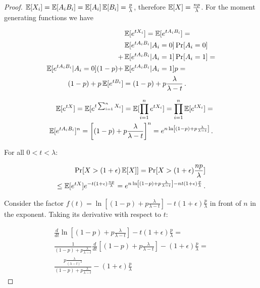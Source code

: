 \begin{proof}
  $\mathop{{}\mathbb{E}}[X_i] = \mathop{{}\mathbb{E}}[A_i B_i] = \mathop{{}\mathbb{E}}[A_i] \mathop{{}\mathbb{E}}[B_i] = \frac{p}{\lambda}$, therefore
  $\mathop{{}\mathbb{E}}[X] = \frac{np}{\lambda}$. For the moment generating functions we have

  \begin{align*}
    &\mathop{{}\mathbb{E}}[e^{t X_i}] = \mathop{{}\mathbb{E}}[e^{t A_i B_i}] =\\
      &\mathop{{}\mathbb{E}}[e^{t A_i B_i}|A_i = 0] \Pr[A_i = 0]\\
    + &\mathop{{}\mathbb{E}}[e^{t A_i B_i}|A_i = 1] \Pr[A_i = 1] = \\
    \mathop{{}\mathbb{E}}[e^{t A_i B_i}|A_i = 0] (1 - p) + &\mathop{{}\mathbb{E}}[e^{t A_i B_i}|A_i = 1] p = \\
    (1 - p) + p \mathop{{}\mathbb{E}}[e^{t B_i}] &= (1 - p) + p \frac{\lambda}{\lambda - t}\,.
  \end{align*}

  \begin{align*}
    \mathop{{}\mathbb{E}}[e^{tX}] = \mathop{{}\mathbb{E}}[e^{t \sum_{i = 1}^n X_i}] = \mathop{{}\mathbb{E}}[\prod_{i = 1}^n e^{t X_i}] = \prod_{i = 1}^n \mathop{{}\mathbb{E}}[e^{t X_i}] = \\
    \mathop{{}\mathbb{E}}[e^{t A_i B_i}]^n = \left[(1 - p) + p\frac{\lambda}{\lambda - t}\right]^n = e^{n \ln\left[(1 - p) + p\frac{\lambda}{\lambda - t}\right]}\,.
  \end{align*}

  For all $0 < t < \lambda$:

  \begin{align*}
    \Pr[X > (1 + \epsilon)\mathop{{}\mathbb{E}}[X]] = \Pr[X > (1 + \epsilon)\frac{np}{\lambda}]\\
    \leq \mathop{{}\mathbb{E}}[e^{tX}] e^{-t(1 + \epsilon)\frac{np}{\lambda}}
    = e^{n \ln\left[(1 - p) + p\frac{\lambda}{\lambda - t}\right] - n t(1 + \epsilon)\frac{p}{\lambda}}\,.
  \end{align*}

  Consider the factor
  $f(t) = \ln\left[(1 - p) + p\frac{\lambda}{\lambda - t}\right] - t(1 + \epsilon)\frac{p}{\lambda}$
  in front of $n$ in the exponent. Taking its derivative with respect to $t$:

  \begin{align*}
    \frac{d}{dt} \ln\left[(1 - p) + p\frac{\lambda}{\lambda - t}\right] - t(1 + \epsilon)\frac{p}{\lambda} = \\
    \frac{1}{(1 - p) + p\frac{\lambda}{\lambda - t}} \frac{d}{dt} \left[(1 - p) + p\frac{\lambda}{\lambda - t}\right] - (1 + \epsilon)\frac{p}{\lambda} = \\
    \frac{p\frac{\lambda}{(\lambda - t)^2}}{(1 - p) + p\frac{\lambda}{\lambda - t}} - (1 + \epsilon)\frac{p}{\lambda}
  \end{align*}


\end{proof}
